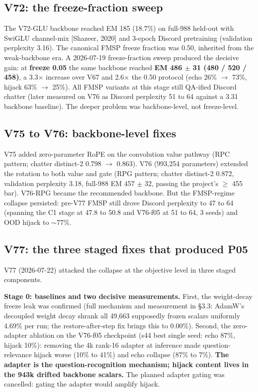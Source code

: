 \documentclass[11pt]{article}
\begin{document}
\subsection{V72: the freeze-fraction sweep}

The V72-GLU backbone reached EM 185 (18.7\%) on full-988 held-out with SwiGLU channel-mix [Shazeer, 2020] and 3-epoch Discord pretraining (validation perplexity 3.16). The canonical FMSP freeze fraction was 0.50, inherited from the weak-backbone era. A 2026-07-19 freeze-fraction sweep produced the decisive gain: at \textbf{freeze 0.05} the same backbone reached \textbf{EM 486 $\pm$ 31 (480 / 520 / 458)}, a 3.3$\times$ increase over V67 and 2.6$\times$ the 0.50 protocol (echo 26\% $\to$ 73\%, hijack 63\% $\to$ 25\%). All FMSP variants at this stage still QA-ified Discord chatter (later measured on V76 as Discord perplexity 51 to 64 against a 3.31 backbone baseline). The deeper problem was backbone-level, not freeze-level.

\subsection{V75 to V76: backbone-level fixes}

V75 added zero-parameter RoPE on the convolution value pathway (RPC pattern; chatter distinct-2 0.798 $\to$ 0.863). V76 (993{,}254 parameters) extended the rotation to both value and gate (RPG pattern; chatter distinct-2 0.872, validation perplexity 3.18, full-988 EM 457 $\pm$ 32, passing the project's $\geq$ 455 bar). V76-RPG became the recommended backbone. But the FMSP-regime collapse persisted: pre-V77 FMSP still drove Discord perplexity to 47 to 64 (spanning the C1 stage at 47.8 to 50.8 and V76-f05 at 51 to 64, 3 seeds) and OOD hijack to $\sim$77\%.

\subsection{V77: the three staged fixes that produced P05}

V77 (2026-07-22) attacked the collapse at the objective level in three staged components.

\textbf{Stage 0: baselines and two decisive measurements.} First, the weight-decay freeze leak was confirmed (full mechanism and measurement in \S3.3: AdamW's decoupled weight decay shrank all 49{,}663 supposedly frozen scalars uniformly 4.69\% per run; the restore-after-step fix brings this to 0.00\%). Second, the zero-adapter ablation on the V76-f05 checkpoint (s44 best single seed: echo 87\%, hijack 10\%): removing the 4k rank-16 adapter at inference made question-relevance hijack worse (10\% to 41\%) and echo collapse (87\% to 7\%). \textbf{The adapter is the question-recognition mechanism; hijack content lives in the 943k drifted backbone scalars.} The planned adapter gating was cancelled: gating the adapter would amplify hijack.
\end{document}
